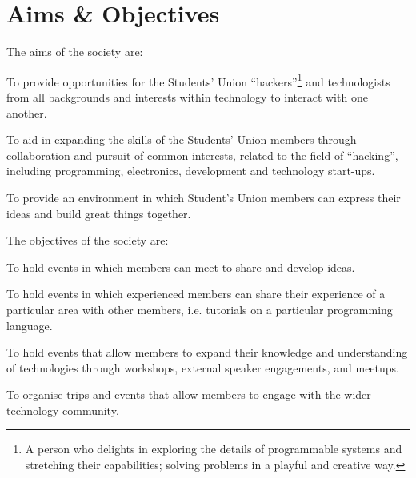 \section{Aims \& Objectives}
\begin{clause}
	The aims of the society are:
\end{clause}

	\begin{subclause}
		 To provide opportunities for the Students' Union ``hackers''\footnote{A person who delights in exploring the details of programmable systems and stretching their capabilities; solving problems in a playful and 		creative way.} and technologists from all backgrounds and interests within technology to interact with one another.
	\end{subclause}
	
	\begin{subclause}
 		To aid in expanding the skills of the Students' Union members through collaboration and pursuit of common interests, related to the field of ``hacking'', including programming, electronics, development and technology start-ups.
	\end{subclause}
	
	\begin{subclause}
		To provide an environment in which Student's Union members can express their ideas and build great things together.
	\end{subclause}

\begin{clause}
	The objectives of the society are:
\end{clause}
	
	\begin{subclause}
 		To hold events in which members can meet to share and develop ideas.
	\end{subclause}
	
	\begin{subclause}
 		To hold events in which experienced members can share their experience of a particular area with other members, i.e. tutorials on a particular programming language.
	\end{subclause}
	
	\begin{subclause}
 		To hold events that allow members to expand their knowledge and understanding of technologies through workshops, external speaker engagements, and meetups.
	\end{subclause}
	
	\begin{subclause}
 		To organise trips and events that allow members to engage with the wider technology community.
	\end{subclause}
	
